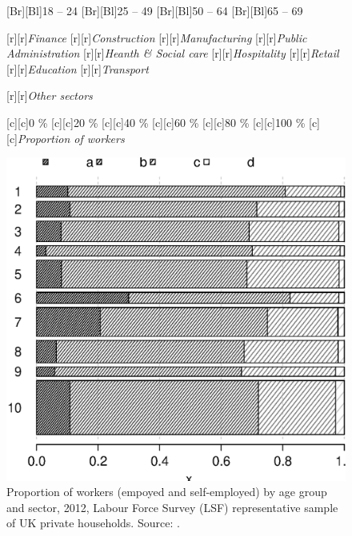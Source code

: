 \documentclass[11 pt, a4paper]{report}
\begin{document}
\begin{figure}[hbtp!]
[Br][Bl]{\small{18 -- 24}}
[Br][Bl]{\small{25 -- 49}}
[Br][Bl]{\small{50 -- 64}}
[Br][Bl]{\small{65 -- 69}}


[r][r]{\small{\emph{Finance}}}
[r][r]{\small{\emph{Construction}}}
[r][r]{\small{\emph{Manufacturing}}}
[r][r]{\small{\emph{Public Administration}}}
[r][r]{\small{\emph{Heanth \& Social care}}}
[r][r]{\small{\emph{Hospitality}}}
[r][r]{\small{\emph{Retail}}}
[r][r]{\small{\emph{Education}}}
[r][r]{\small{\emph{Transport}}}

[r][r]{\small{\emph{Other sectors}}}

[c][c]{\small{0 \%}}
[c][c]{\small{20 \%}}
[c][c]{\small{40 \%}}
[c][c]{\small{60 \%}}
[c][c]{\small{80 \%}}
[c][c]{\small{100 \%}}
[c][c]{\small{\emph{Proportion of workers}}}


\includegraphics[width=\textwidth]{../figures/Fig5.1.eps}
\caption{Proportion of workers (empoyed and self-employed) by age group and sector, 2012, Labour Force Survey (LSF) representative sample of UK private households. Source: \cite{DWP2013}.}\label{Fig:51}
\end{figure}
\end{document}
